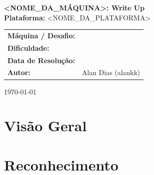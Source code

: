 \documentclass[12pt]{article}
\begin{document}
\begin{titlepage}
    \centering
    \vspace*{2cm}
    {\Huge \textbf{<NOME_DA_MÁQUINA>: Write Up}}\\[0.5cm]
    {\large \textbf{Plataforma:} <NOME_DA_PLATAFORMA>}\\[1.5cm]
    
    \vfill
    
    \begin{table}[h!]
        \centering
        \small
        \begin{tabular}{ll}
            \textbf{Máquina / Desafio:} & \\
            \textbf{Dificuldade:}      & \\
            \textbf{Data de Resolução:} &  \\
            \textbf{Autor:}             &  Alan Dias (alankk)\\
        \end{tabular}
    \end{table}
    
    \vfill
    \begin{figure}[h!]
        \centering
    \end{figure}
    \vspace*{1cm}
    {\large \today}
\end{titlepage}

\newpage

\tableofcontents
\newpage

\section{Visão Geral}


\section{Reconhecimento}


\end{document}
